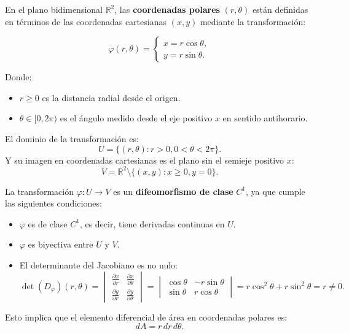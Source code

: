 \begin{definición}
En el plano bidimensional $\mathbb{R}^2$, las \textbf{coordenadas polares} $(r, \theta)$ están definidas en términos de las coordenadas cartesianas $(x, y)$ mediante la transformación:

\begin{minipage}{0.5\textwidth}
    \[
        \varphi(r, \theta) =
        \begin{cases}
            x = r\cos\theta, \\
            y = r\sin\theta.
        \end{cases}
    \]
\end{minipage}
\begin{minipage}{0.5\textwidth}
    \centering
    
\end{minipage}

Donde:
\begin{itemize}
    \item $r \geq 0$ es la distancia radial desde el origen.
    \item $\theta \in [0, 2\pi)$ es el ángulo medido desde el eje positivo $x$ en sentido antihorario.
\end{itemize}

El dominio de la transformación es: $$ U = \{(r, \theta) : r > 0, 0 < \theta <
    2\pi\}. $$ Y su imagen en coordenadas cartesianas es el plano sin el semieje
positivo $x$: $$ V = \mathbb{R}^2 \setminus \{ (x,y) : x \geq 0, y = 0\}. $$

La transformación $\varphi: U \to V$ es un \textbf{difeomorfismo de clase}
$C^1$, ya que cumple las siguientes condiciones:
\begin{itemize}
    \item $\varphi$ es de clase $C^1$, es decir, tiene derivadas continuas en $U$.
    \item $\varphi$ es biyectiva entre $U$ y $V$.
    \item El determinante del Jacobiano es no nulo: $$ \det(D_{\varphi})(r, \theta) = \begin{vmatrix}
                  \frac{\partial x}{\partial r} & \frac{\partial x}{\partial \theta} \\
                  \frac{\partial y}{\partial r} & \frac{\partial y}{\partial \theta}
              \end{vmatrix} =
              \begin{vmatrix}
                  \cos\theta & -r\sin\theta \\
                  \sin\theta & r\cos\theta
              \end{vmatrix} = r\cos^2\theta + r\sin^2\theta = r \neq 0.
          $$
\end{itemize}
Esto implica que el elemento diferencial de área en coordenadas polares es:
$$
    dA = r \, dr \, d\theta.
$$
\end{definición}

